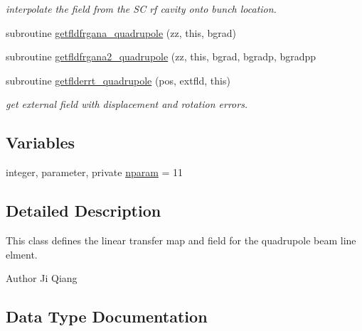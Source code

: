 \begin{DoxyCompactItemize}
\begin{DoxyCompactList}\small\item\em interpolate the field from the SC rf cavity onto bunch location. \end{DoxyCompactList}\item 
subroutine \mbox{\hyperlink{namespacequadrupoleclass_aac2c756ddd587ca842555670b0ad16b3}{getfldfrgana\+\_\+quadrupole}} (zz, this, bgrad)
\item 
subroutine \mbox{\hyperlink{namespacequadrupoleclass_ab1abe8916ad3dace3e5d1373da4688ac}{getfldfrgana2\+\_\+quadrupole}} (zz, this, bgrad, bgradp, bgradpp
\item 
subroutine \mbox{\hyperlink{namespacequadrupoleclass_a25a1f7329a298c01c802f96b0547ab6c}{getflderrt\+\_\+quadrupole}} (pos, extfld, this)
\begin{DoxyCompactList}\small\item\em get external field with displacement and rotation errors. \end{DoxyCompactList}\end{DoxyCompactItemize}
\subsection*{Variables}
\begin{DoxyCompactItemize}
\item 
integer, parameter, private \mbox{\hyperlink{namespacequadrupoleclass_a8eba81bd9796e431c21d0f46260b0c6c}{nparam}} = 11
\end{DoxyCompactItemize}


\subsection{Detailed Description}
This class defines the linear transfer map and field for the quadrupole beam line elment. 

\begin{DoxyAuthor}{Author}
Ji Qiang 
\end{DoxyAuthor}


\subsection{Data Type Documentation}
\label{structquadrupoleclass_1_1quadrupole}

